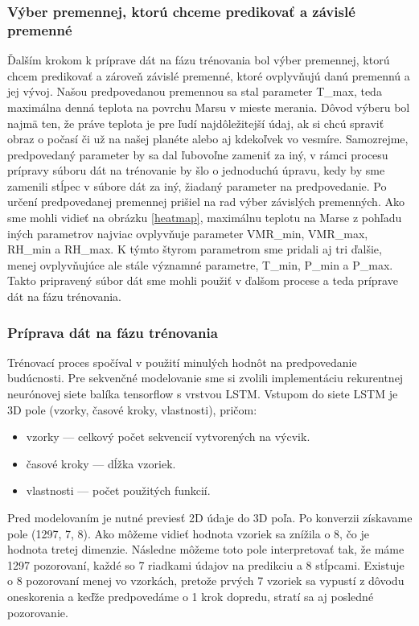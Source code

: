 \newpage

\subsubsection{Výber premennej, ktorú chceme predikovať a závislé premenné}
Ďalším krokom k príprave dát na fázu trénovania bol výber premennej, ktorú chcem predikovať a zároveň závislé premenné, ktoré ovplyvňujú danú premennú a jej vývoj. Našou predpovedanou premennou sa stal parameter T\_max, teda maximálna denná teplota na povrchu Marsu v mieste merania. Dôvod výberu bol najmä ten, že práve teplota je pre ľudí najdôležitejší údaj, ak si chcú spraviť obraz o počasí či už na našej planéte alebo aj kdekoľvek vo vesmíre. Samozrejme, predpovedaný parameter by sa dal ľubovoľne zameniť za iný, v rámci procesu prípravy súboru dát na trénovanie by šlo o jednoduchú úpravu, kedy by sme zamenili stĺpec v súbore dát za iný, žiadaný parameter na predpovedanie. 
Po určení predpovedanej premennej prišiel na rad výber závislých premenných. Ako sme mohli vidieť na obrázku \ref{heatmap}, maximálnu teplotu na Marse z pohľadu iných parametrov najviac ovplyvňuje parameter VMR\_min, VMR\_max, RH\_min a RH\_max. K týmto štyrom parametrom sme pridali aj tri ďalšie, menej ovplyvňujúce ale stále významné parametre, T\_min, P\_min a P\_max. Takto pripravený súbor dát sme mohli použiť v ďalšom procese a teda príprave dát na fázu trénovania.

\subsubsection{Príprava dát na fázu trénovania}
\label{priprava_dat}
Trénovací proces spočíval v použití minulých hodnôt na predpovedanie budúcnosti. Pre sekvenčné modelovanie sme si zvolili implementáciu rekurentnej neurónovej siete balíka tensorflow s vrstvou LSTM. Vstupom do siete LSTM je 3D pole (vzorky, časové kroky, vlastnosti), pričom:
\begin{itemize}
    \item vzorky — celkový počet sekvencií vytvorených na výcvik.
    \item časové kroky — dĺžka vzoriek.
    \item vlastnosti — počet použitých funkcií.
\end{itemize}

Pred modelovaním je nutné previesť 2D údaje do 3D poľa. Po konverzii získavame pole (1297, 7, 8). Ako môžeme vidieť hodnota vzoriek sa znížila o 8, čo je hodnota tretej dimenzie. Následne môžeme toto pole interpretovať tak, že máme 1297 pozorovaní, každé so 7 riadkami údajov na predikciu a 8 stĺpcami. Existuje o 8 pozorovaní menej vo vzorkách, pretože prvých 7 vzoriek sa vypustí z dôvodu oneskorenia a keďže predpovedáme o 1 krok dopredu, stratí sa aj posledné pozorovanie.

